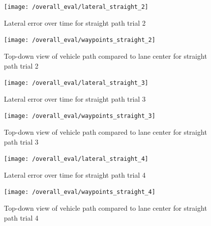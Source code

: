 \documentclass[titlepage, draft]{article}
\begin{document}
{\begin{figure}[H]
	\centering
	\begin{minipage}{.45\textwidth}
		\centering
		\texttt{[image: /overall\_eval/lateral\_straight\_2]}
		\caption{Lateral error over time for straight path trial 2}
		\label{fig:straight_lat_2}
	\end{minipage}%
	\hspace{0.1\textwidth}%
	\begin{minipage}{.45\textwidth}
		\centering
		\texttt{[image: /overall\_eval/waypoints\_straight\_2]}
		\caption{Top-down view of vehicle path compared to lane center for straight path trial 2}
		\label{fig:straight_way_2}
	\end{minipage}
\end{figure}

\begin{figure}[H]
	\centering
	\begin{minipage}{.45\textwidth}
		\centering
		\texttt{[image: /overall\_eval/lateral\_straight\_3]}
		\caption{Lateral error over time for straight path trial 3}
		\label{fig:straight_lat_3}
	\end{minipage}%
	\hspace{0.1\textwidth}%
	\begin{minipage}{.45\textwidth}
		\centering
		\texttt{[image: /overall\_eval/waypoints\_straight\_3]}
		\caption{Top-down view of vehicle path compared to lane center for straight path trial 3}
		\label{fig:straight_way_3}
	\end{minipage}
\end{figure}

\begin{figure}[H]
	\centering
	\begin{minipage}{.45\textwidth}
		\centering
		\texttt{[image: /overall\_eval/lateral\_straight\_4]}
		\caption{Lateral error over time for straight path trial 4}
		\label{fig:straight_lat_4}
	\end{minipage}%
	\hspace{0.1\textwidth}%
	\begin{minipage}{.45\textwidth}
		\centering
		\texttt{[image: /overall\_eval/waypoints\_straight\_4]}
		\caption{Top-down view of vehicle path compared to lane center for straight path trial 4}
		\label{fig:straight_way_4}
	\end{minipage}
\end{figure}

}
\end{document}
